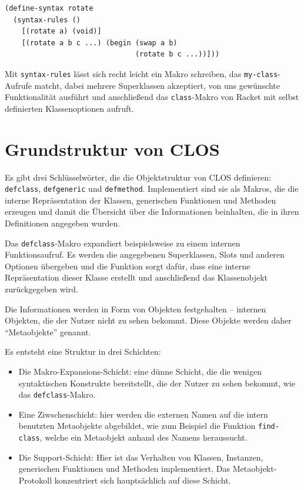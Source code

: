 \begin{lstlisting}
(define-syntax rotate
  (syntax-rules ()
    [(rotate a) (void)]
    [(rotate a b c ...) (begin (swap a b)
                               (rotate b c ...))]))
\end{lstlisting}

Mit \texttt{syntax-rules} lässt sich recht leicht ein Makro schreiben, das  \texttt{my-class}-Aufrufe matcht, dabei mehrere Superklassen akzeptiert, von uns gewünschte Funktionalität ausführt und anschließend das \texttt{class}-Makro von Racket mit selbst definierten Klassenoptionen aufruft.


\section{Grundstruktur von CLOS}
Es gibt drei Schlüsselwörter, die die Objektstruktur von CLOS definieren:  \texttt{defclass}, \texttt{defgeneric} und \texttt{defmethod}. Implementiert sind sie als Makros, die die interne Repräsentation der Klassen, generischen Funktionen und Methoden erzeugen und damit die Übersicht über die Informationen beinhalten, die in ihren Definitionen angegeben wurden.

Das \texttt{defclass}-Makro expandiert beispielsweise zu einem internen Funktionsaufruf. Es werden die angegebenen Superklassen, Slots und anderen Optionen übergeben und die Funktion sorgt dafür, dass eine interne Repräsentation dieser Klasse erstellt und anschließend das Klassenobjekt zurückgegeben wird.

Die Informationen werden in Form von Objekten festgehalten -- internen Objekten, die der Nutzer nicht zu sehen bekommt. Diese Objekte werden daher ``Metaobjekte'' genannt.

Es entsteht eine Struktur in drei Schichten:
\begin{itemize}
 \item Die Makro-Expansions-Schicht: eine dünne Schicht, die die wenigen syntaktischen Konstrukte bereitstellt, die der Nutzer zu sehen bekommt, wie das \texttt{defclass}-Makro.
 \item Eine Ziwschenschicht: hier werden die externen Namen auf die intern benutzten Metaobjekte abgebildet, wie zum Beispiel die Funktion \texttt{find-class}, welche ein Metaobjekt anhand des Namens heraussucht.
 \item Die Support-Schicht: Hier ist das Verhalten von Klassen, Instanzen, generischen Funktionen und Methoden implementiert. Das Metaobjekt-Protokoll konzentriert sich hauptsächlich auf diese Schicht.
\end{itemize}

